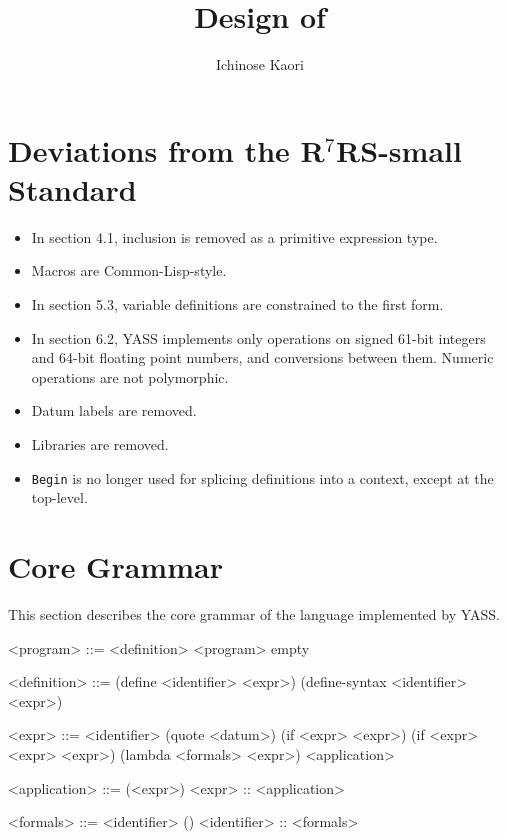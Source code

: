 \documentclass{article}
\title{Design of \name}
\author{Ichinose Kaori}
\newcommand{\name}{YASS}
\begin{document}
\maketitle

\section{Deviations from the R$^7$RS-small Standard}

\label{deviations}

\begin{itemize}
\item In section 4.1, inclusion is removed as a primitive expression type.
\item Macros are Common-Lisp-style.
\item In section 5.3, variable definitions are constrained to the first form.
\item In section 6.2, \name{} implements only operations on signed 61-bit integers and 64-bit
  floating point numbers, and conversions between them. Numeric operations are not
  polymorphic.
\item Datum labels are removed.
\item Libraries are removed.
\item \verb|Begin| is no longer used for splicing definitions into a context, except at
  the top-level.
\end{itemize}

\section{Core Grammar}

This section describes the core grammar of the language
implemented by \name.

\begin{grammar}

  <program> ::= <definition> <program>
  \alt empty

  <definition> ::= (define <identifier> <expr>)
  \alt (define-syntax <identifier> <expr>)

  <expr> ::= <identifier>
  \alt (quote <datum>)
  \alt (if <expr> <expr>)
  \alt (if <expr> <expr> <expr>)
  \alt (lambda <formals> <expr>)
  \alt <application>

  <application> ::= (<expr>)
  \alt <expr> :: <application>

  <formals> ::= <identifier>
  \alt ()
  \alt <identifier> :: <formals>
  
\end{grammar}
\end{document}
